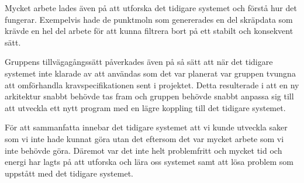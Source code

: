 Mycket arbete lades även på att utforska det tidigare systemet och förstå hur det fungerar. Exempelvis hade de punktmoln som genererades en del skräpdata som krävde en hel del arbete för att kunna filtrera bort på ett stabilt och konsekvent sätt.

Gruppens tillvägagångssätt påverkades även på så sätt att när det tidigare systemet inte klarade av att användas som det var planerat var gruppen tvungna att omförhandla kravspecifikationen sent i projektet. Detta resulterade i att en ny arkitektur snabbt behövde tas fram och gruppen behövde snabbt anpassa sig till att utveckla ett nytt program med en lägre koppling till det tidigare systemet.

För att sammanfatta innebar det tidigare systemet att vi kunde utveckla saker som vi inte hade kunnat göra utan det eftersom det var mycket arbete som vi inte behövde göra. Däremot var det inte helt problemfritt och mycket tid och energi har lagts på att utforska och lära oss systemet samt att lösa problem som uppstått med det tidigare systemet.



